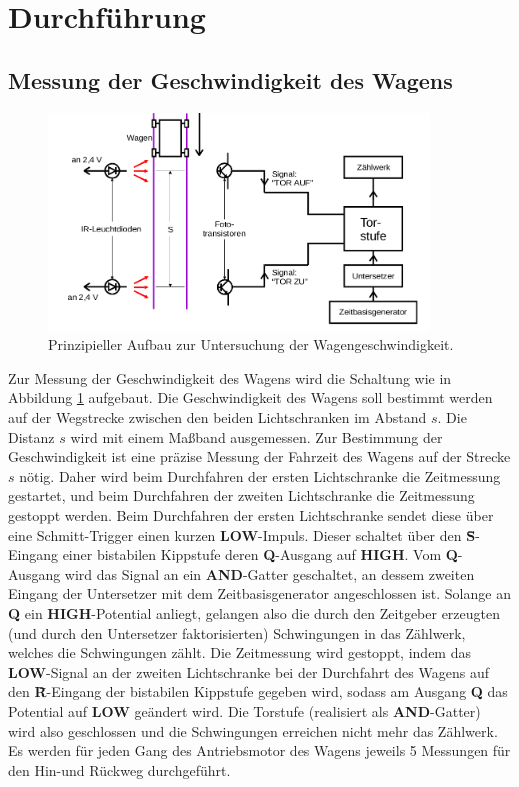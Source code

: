 \section{Durchführung}
\label{sec:Durchführung}
\subsection{Messung der Geschwindigkeit des Wagens}
\label{sec:speedygonzales}
\begin{figure}
	\includegraphics[width=0.9\textwidth]{Bilder/wagengeschwindigkeit.png}
	\caption{Prinzipieller Aufbau zur Untersuchung der Wagengeschwindigkeit. \cite{Anleitung}}
	\label{fig:wagen} %
\end{figure}
Zur Messung der Geschwindigkeit des Wagens wird die Schaltung wie in Abbildung \ref{fig:wagen} aufgebaut.
Die Geschwindigkeit des Wagens soll bestimmt werden auf der Wegstrecke zwischen den beiden Lichtschranken im Abstand $s$.
Die Distanz $s$ wird mit einem Maßband ausgemessen.
Zur Bestimmung der Geschwindigkeit ist eine präzise Messung der Fahrzeit des Wagens auf der Strecke $s$ nötig.
Daher wird beim Durchfahren der ersten Lichtschranke die Zeitmessung gestartet, und beim Durchfahren der zweiten Lichtschranke die Zeitmessung gestoppt werden.
Beim Durchfahren der ersten Lichtschranke sendet diese über eine Schmitt-Trigger einen kurzen \textbf{LOW}-Impuls. Dieser schaltet über den \textbf{\={S}}-Eingang einer bistabilen Kippstufe deren \textbf{Q}-Ausgang auf \textbf{HIGH}.
Vom \textbf{Q}-Ausgang wird das Signal an ein \textbf{AND}-Gatter geschaltet,
an dessem zweiten Eingang der Untersetzer mit dem Zeitbasisgenerator angeschlossen ist.
Solange an \textbf{Q} ein \textbf{HIGH}-Potential anliegt, gelangen also die durch den Zeitgeber erzeugten (und durch den Untersetzer faktorisierten) Schwingungen in das Zählwerk, welches die Schwingungen zählt.
Die Zeitmessung wird gestoppt, indem das \textbf{LOW}-Signal an der zweiten Lichtschranke  bei der Durchfahrt des Wagens auf den \textbf{\={R}}-Eingang der bistabilen Kippstufe gegeben wird,
sodass am Ausgang \textbf{Q} das Potential auf \textbf{LOW} geändert wird. Die Torstufe (realisiert als \textbf{AND}-Gatter) wird also geschlossen und die Schwingungen erreichen nicht mehr das Zählwerk.
Es werden für jeden Gang des Antriebsmotor des Wagens jeweils 5 Messungen für den Hin-und Rückweg durchgeführt.


